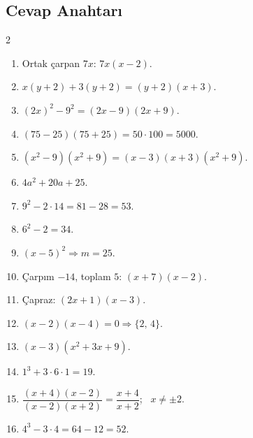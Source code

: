 \subsection*{Cevap Anahtarı}
{\small
\begin{multicols}{2}
\begin{enumerate}[label=\textbf{\arabic*.},leftmargin=*,itemsep=1pt]
\item Ortak çarpan \(7x\): \(7x(x-2)\).
\item \(x(y+2)+3(y+2)=(y+2)(x+3)\).
\item \((2x)^2-9^2=(2x-9)(2x+9)\).
\item \((75-25)(75+25)=50\cdot 100=5000\).
\item \((x^2-9)(x^2+9)=(x-3)(x+3)(x^2+9)\).
\item \(4a^2+20a+25\).
\item \(9^2-2\cdot 14=81-28=53\).
\item \(6^2-2=34\).
\item \((x-5)^2\Rightarrow m=25\).
\item Çarpım \(-14\), toplam \(5\): \((x+7)(x-2)\).
\item Çapraz: \((2x+1)(x-3)\).
\item \((x-2)(x-4)=0\Rightarrow\{2,\,4\}\).
\item \((x-3)(x^2+3x+9)\).
\item \(1^3+3\cdot 6\cdot 1=19\).
\item \(\dfrac{(x+4)(x-2)}{(x-2)(x+2)}=\dfrac{x+4}{x+2}\); \ \(x\neq\pm 2\).
\item \(4^3-3\cdot 4=64-12=52\).
\end{enumerate}
\end{multicols}}
